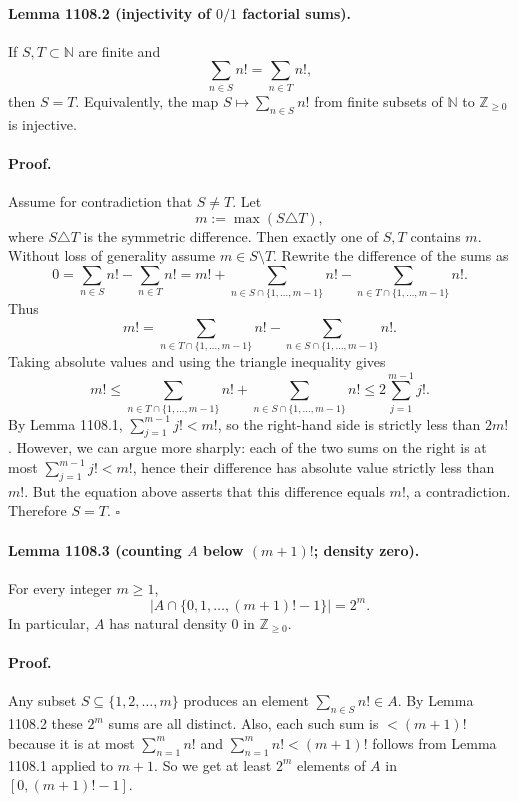 \paragraph{Lemma 1108.2 (injectivity of $0/1$ factorial sums).}
If $S,T\subset\mathbb{N}$ are finite and
\[\sum_{n\in S} n! = \sum_{n\in T} n!,\]
then $S=T$. Equivalently, the map $S\mapsto \sum_{n\in S} n!$ from finite subsets of $\mathbb{N}$ to $\mathbb{Z}_{\ge 0}$ is injective.

\paragraph{Proof.}
Assume for contradiction that $S\ne T$. Let
\[m:=\max(S\triangle T),\]
where $S\triangle T$ is the symmetric difference.
Then exactly one of $S,T$ contains $m$. Without loss of generality assume $m\in S\setminus T$.
Rewrite the difference of the sums as
\[0=\sum_{n\in S} n! - \sum_{n\in T} n! = m! + \sum_{n\in S\cap\{1,\dots,m-1\}} n! - \sum_{n\in T\cap\{1,\dots,m-1\}} n!.\]
Thus
\[m! = \sum_{n\in T\cap\{1,\dots,m-1\}} n! - \sum_{n\in S\cap\{1,\dots,m-1\}} n!.
\]
Taking absolute values and using the triangle inequality gives
\[m! \le \sum_{n\in T\cap\{1,\dots,m-1\}} n! + \sum_{n\in S\cap\{1,\dots,m-1\}} n! \le 2\sum_{j=1}^{m-1} j!.
\]
By Lemma 1108.1, $\sum_{j=1}^{m-1} j! < m!$, so the right-hand side is strictly less than $2m!$.
However, we can argue more sharply: each of the two sums on the right is at most $\sum_{j=1}^{m-1} j! < m!$, hence their difference has absolute value strictly less than $m!$.
But the equation above asserts that this difference equals $m!$, a contradiction.
Therefore $S=T$. \hfill $\square$

\paragraph{Lemma 1108.3 (counting $A$ below $(m+1)!$; density zero).}
For every integer $m\ge 1$,
\[\left|A\cap\{0,1,\dots,(m+1)!-1\}\right| = 2^m.
\]
In particular, $A$ has natural density $0$ in $\mathbb{Z}_{\ge 0}$.

\paragraph{Proof.}
Any subset $S\subseteq\{1,2,\dots,m\}$ produces an element $\sum_{n\in S} n!\in A$.
By Lemma 1108.2 these $2^m$ sums are all distinct.
Also, each such sum is $< (m+1)!$ because it is at most $\sum_{n=1}^{m} n!$ and $\sum_{n=1}^{m} n! < (m+1)!$ follows from Lemma 1108.1 applied to $m+1$.
So we get at least $2^m$ elements of $A$ in $[0,(m+1)!-1]$.

